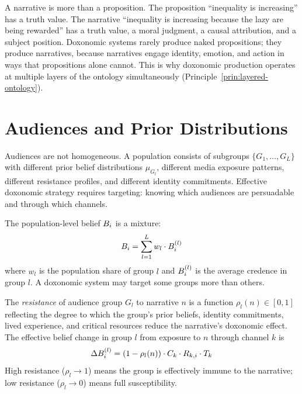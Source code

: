 \begin{remark}
\label{rem:narrative-proposition}
A narrative is more than a proposition.
The proposition ``inequality is increasing'' has a truth value.
The narrative ``inequality is increasing because the lazy are being rewarded'' has a truth value, a moral judgment, a causal attribution, and a subject position.
Doxonomic systems rarely produce naked propositions; they produce narratives, because narratives engage identity, emotion, and action in ways that propositions alone cannot.
This is why doxonomic production operates at multiple layers of the ontology simultaneously (Principle~\ref{prin:layered-ontology}).
\end{remark}


\section{Audiences and Prior Distributions}
\label{sec:ch4-audiences}

Audiences are not homogeneous.
A population consists of subgroups $\{G_1, \ldots, G_L\}$ with different prior belief distributions $\mu_{G_l}$, different media exposure patterns, different resistance profiles, and different identity commitments.
Effective doxonomic strategy requires targeting: knowing which audiences are persuadable and through which channels.

\begin{definition}
\label{def:audience-heterogeneity}
The population-level belief $B_{i}$ is a mixture:
\[
  B_{i} = \sum_{l=1}^{L} w_l \cdot B_{i}^{(l)}
\]
where $w_l$ is the population share of group $l$ and $B_{i}^{(l)}$ is the average credence in group $l$.
A doxonomic system may target some groups more than others.
\end{definition}

\begin{definition}
\label{def:resistance}
The \emph{resistance} of audience group $G_l$ to narrative $n$ is a function $\rho_l(n) \in [0,1]$ reflecting the degree to which the group's prior beliefs, identity commitments, lived experience, and critical resources reduce the narrative's doxonomic effect.
The effective belief change in group $l$ from exposure to $n$ through channel $k$ is
\[
  \Delta B_{i}^{(l)} = (1 - \rho_l(n)) \cdot C_{k} \cdot R_{k,i} \cdot T_{k}
\]
High resistance ($\rho_l \to 1$) means the group is effectively immune to the narrative; low resistance ($\rho_l \to 0$) means full susceptibility.
\end{definition}

